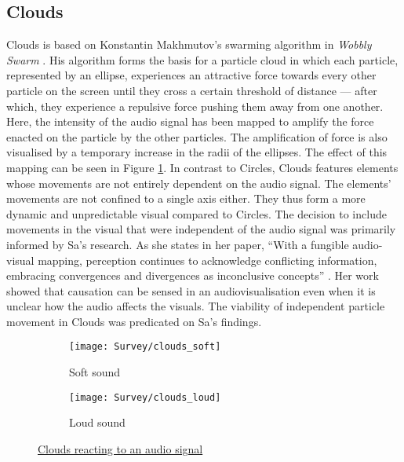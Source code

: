 \documentclass[../initial_thesis.tex]{subfiles}
\begin{document}
\subsection{Clouds}
Clouds is based on Konstantin Makhmutov's swarming algorithm in \textit{Wobbly Swarm} \cite{Makhmutov}. His algorithm forms the basis for a particle cloud in which each particle, represented by an ellipse, experiences an attractive force towards every other particle on the screen until they cross a certain threshold of distance --- after which, they experience a repulsive force pushing them away from one another. Here, the intensity of the audio signal has been mapped to amplify the force enacted on the particle by the other particles. The amplification of force is also visualised by a temporary increase in the radii of the ellipses. The effect of this mapping can be seen in Figure \ref{fig:clouds1}. In contrast to Circles, Clouds features elements whose movements are not entirely dependent on the audio signal. The elements' movements are not confined to a single axis either. They thus form a more dynamic and unpredictable visual compared to Circles. The decision to include movements in the visual that were independent of the audio signal was primarily informed by Sa's research. As she states in her paper, ``With a fungible audio-visual mapping, perception continues to acknowledge conflicting information, embracing convergences and divergences as inconclusive concepts'' \cite{Sa2014}. Her work showed that causation can be sensed in an audiovisualisation even when it is unclear how the audio affects the visuals. The viability of independent particle movement in Clouds was predicated on Sa's findings.

\begin{figure}
  \begin{subfigure}{0.5\textwidth}
    \texttt{[image: Survey/clouds\_soft]}
    \caption{Soft sound}
  \end{subfigure} 
  \begin{subfigure}{0.5\textwidth}
    \texttt{[image: Survey/clouds\_loud]}
    \caption{Loud sound}
  \end{subfigure}
  \caption{\href{https://vimeo.com/326766069}{Clouds reacting to an audio signal}}
  \label{fig:clouds1}
\end{figure}
\end{document}
